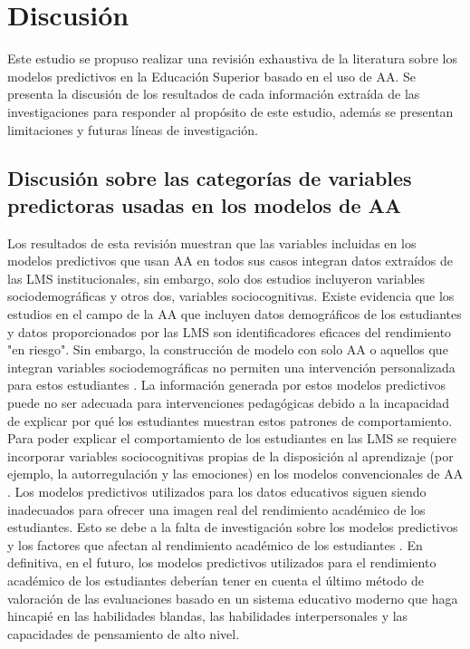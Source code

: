 \documentclass[spanish]{textolivre}
\begin{document}
\section{Discusión}
Este estudio se propuso realizar una revisión exhaustiva de la literatura sobre los modelos predictivos en la Educación Superior basado en el uso de AA. Se presenta la discusión de los resultados de cada información extraída de las investigaciones para responder al propósito de este estudio, además se presentan limitaciones y futuras líneas de investigación.

\subsection*{Discusión sobre las categorías de variables predictoras usadas en los modelos de AA}
Los resultados de esta revisión muestran que las variables incluidas en los modelos predictivos que usan AA en todos sus casos integran datos extraídos de las LMS institucionales, sin embargo, solo dos estudios incluyeron variables sociodemográficas y otros dos, variables sociocognitivas. Existe evidencia que los estudios en el campo de la AA que incluyen datos demográficos de los estudiantes y datos proporcionados por las LMS son identificadores eficaces del rendimiento "en riesgo". Sin embargo, la construcción de modelo con solo AA o aquellos que integran variables sociodemográficas no permiten una intervención personalizada para estos estudiantes \cite{zheng2020}. La información generada por estos modelos predictivos puede no ser adecuada para intervenciones pedagógicas debido a la incapacidad de explicar por qué los estudiantes muestran estos patrones de comportamiento. Para poder explicar el comportamiento de los estudiantes en las LMS se requiere incorporar variables sociocognitivas propias de la disposición al aprendizaje (por ejemplo, la autorregulación y las emociones) en los modelos convencionales de AA \cite{tempelaar2017}. Los modelos predictivos utilizados para los datos educativos siguen siendo inadecuados para ofrecer una imagen real del rendimiento académico de los estudiantes. Esto se debe a la falta de investigación sobre los modelos predictivos y los factores que afectan al rendimiento académico de los estudiantes \cite{zulkifli2019}. En definitiva, en el futuro, los modelos predictivos utilizados para el rendimiento académico de los estudiantes deberían tener en cuenta el último método de valoración de las evaluaciones basado en un sistema educativo moderno que haga hincapié en las habilidades blandas, las habilidades interpersonales y las capacidades de pensamiento de alto nivel.
\end{document}
